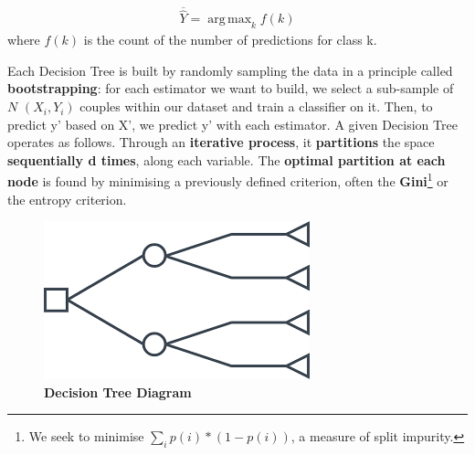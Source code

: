 \documentclass[12pt]{report}
\DeclareMathOperator*{\argmax}{arg\,max}
\begin{document}
\begin{gather*}
\overline{\hat{Y}} = \argmax_k f(k)
\end{gather*} where $f(k)$ is the count of the number of predictions for class k.

Each Decision Tree is built by randomly sampling the data in a principle called \textbf{bootstrapping}: for each estimator we want to build, we select a sub-sample of $N$ $(X_{i},Y_{i})$ couples within our dataset and train a classifier on it. 
Then, to predict y' based on X', we predict y' with each estimator.\newline
A given Decision Tree operates as follows. Through an \textbf{iterative process}, it  \textbf{partitions} the space \textbf{sequentially d times}, along each variable. The \textbf{optimal partition at each node} is found by minimising a previously defined criterion, often the \textbf{Gini}\footnote{We seek to minimise $\sum_{i}{p(i)*(1-p(i))}$, a measure of split impurity.} or the entropy criterion.\newline

\begin{figure}
\centering
\includegraphics[scale=0.7]{decision_tree.png}
\caption{\textbf{Decision Tree Diagram}}
\label{fig:decisionTree}
\end{figure}
\end{document}
